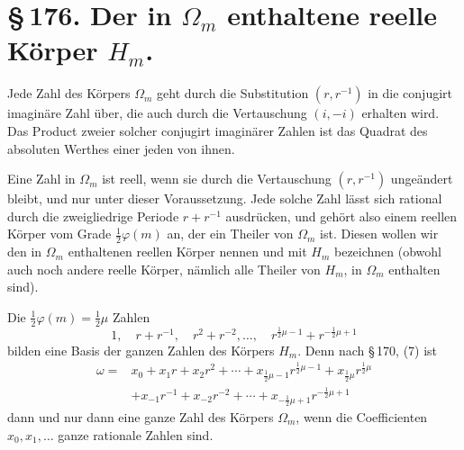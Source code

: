 \documentclass[11pt]{article}
\begin{document}
\section*{\S\,176. Der in $\Omega_m$ enthaltene reelle Körper $H_m$.}

Jede Zahl des Körpers $\Omega_m$ geht durch die Substitution $(r,r^{-1})$ in die conjugirt imaginäre Zahl über, die auch durch die Vertauschung $(i,-i)$ erhalten wird. Das Product zweier solcher conjugirt imaginärer Zahlen ist das Quadrat des absoluten Werthes einer jeden von ihnen.

Eine Zahl in $\Omega_m$ ist reell, wenn sie durch die Vertauschung $(r,r^{-1})$ ungeändert bleibt, und nur unter dieser Voraussetzung. Jede solche Zahl lässt sich rational durch die zweigliedrige Periode $r+r^{-1}$ ausdrücken, und gehört also einem reellen Körper vom Grade $\frac12\varphi(m)$ an, der ein Theiler von $\Omega_m$ ist. Diesen wollen wir den in $\Omega_m$ enthaltenen reellen Körper nennen und mit $H_m$ bezeichnen (obwohl auch noch andere reelle Körper, nämlich alle Theiler von $H_m$, in $\Omega_m$ enthalten sind).

Die $\frac12\varphi(m)=\frac12\mu$ Zahlen
\begin{equation}
1,\quad r+r^{-1},\quad r^2+r^{-2},\ldots,\quad r^{\frac12\mu-1}+r^{-\frac12\mu+1}
\tag{1}
\end{equation}
bilden eine Basis der ganzen Zahlen des Körpers $H_m$. Denn nach \S\,170, (7) ist
\begin{equation}
\begin{aligned}
\omega={}&x_0+x_1r+x_2r^2+\cdots+x_{\frac12\mu-1}r^{\frac12\mu-1}+x_{\frac12\mu}r^{\frac12\mu} \\
&+x_{-1}r^{-1}+x_{-2}r^{-2}+\cdots+x_{-\frac12\mu+1}r^{-\frac12\mu+1}
\end{aligned}
\tag{2}
\end{equation}
dann und nur dann eine ganze Zahl des Körpers $\Omega_m$, wenn die Coefficienten $x_0,x_1,\ldots$ ganze rationale Zahlen sind.
\end{document}
